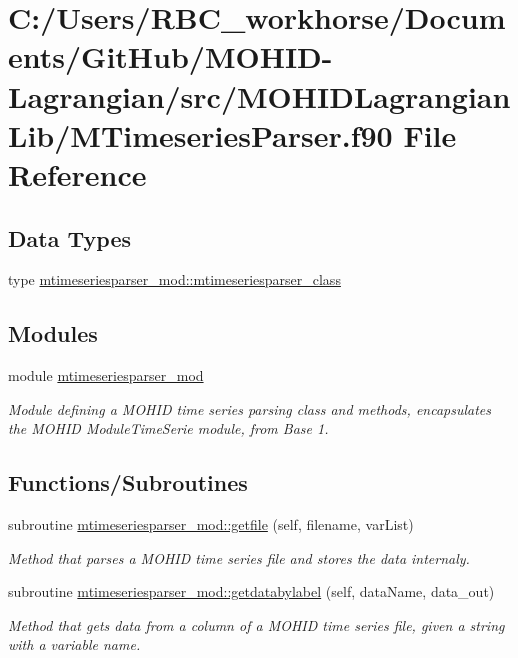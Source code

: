 \hypertarget{_m_timeseries_parser_8f90}{}\section{C\+:/\+Users/\+R\+B\+C\+\_\+workhorse/\+Documents/\+Git\+Hub/\+M\+O\+H\+I\+D-\/\+Lagrangian/src/\+M\+O\+H\+I\+D\+Lagrangian\+Lib/\+M\+Timeseries\+Parser.f90 File Reference}
\label{_m_timeseries_parser_8f90}
\subsection*{Data Types}
\begin{DoxyCompactItemize}
\item 
type \mbox{\hyperlink{structmtimeseriesparser__mod_1_1mtimeseriesparser__class}{mtimeseriesparser\+\_\+mod\+::mtimeseriesparser\+\_\+class}}
\end{DoxyCompactItemize}
\subsection*{Modules}
\begin{DoxyCompactItemize}
\item 
module \mbox{\hyperlink{namespacemtimeseriesparser__mod}{mtimeseriesparser\+\_\+mod}}
\begin{DoxyCompactList}\small\item\em Module defining a M\+O\+H\+ID time series parsing class and methods, encapsulates the M\+O\+H\+ID Module\+Time\+Serie module, from Base 1. \end{DoxyCompactList}\end{DoxyCompactItemize}
\subsection*{Functions/\+Subroutines}
\begin{DoxyCompactItemize}
\item 
subroutine \mbox{\hyperlink{namespacemtimeseriesparser__mod_abbc158c89dfc5a988984c1e9acd6dc48}{mtimeseriesparser\+\_\+mod\+::getfile}} (self, filename, var\+List)
\begin{DoxyCompactList}\small\item\em Method that parses a M\+O\+H\+ID time series file and stores the data internaly. \end{DoxyCompactList}\item 
subroutine \mbox{\hyperlink{namespacemtimeseriesparser__mod_a99a6266d1929abd218dd968d5c27a30d}{mtimeseriesparser\+\_\+mod\+::getdatabylabel}} (self, data\+Name, data\+\_\+out)
\begin{DoxyCompactList}\small\item\em Method that gets data from a column of a M\+O\+H\+ID time series file, given a string with a variable name. \end{DoxyCompactList}\end{DoxyCompactItemize}
